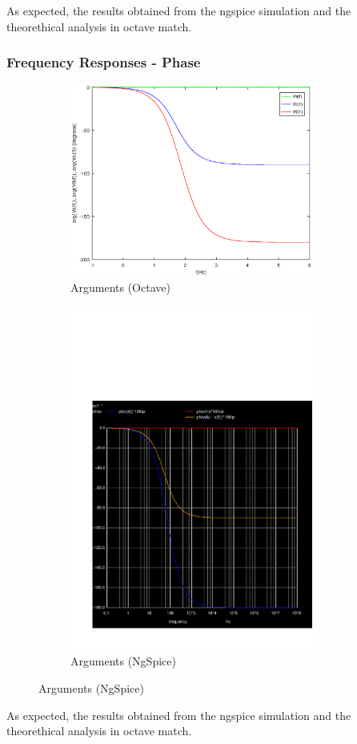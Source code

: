 As expected, the results obtained from the ngspice simulation and the theorethical analysis in octave match.

\subsubsection{Frequency Responses - Phase}

\begin{figure}[H] 
\centering
\begin{subfigure}{0.5\textwidth}
\includegraphics[width=8cm]{Arguments.eps}
\caption{Arguments (Octave)}
\label{fig:first}
\end{subfigure}
\begin{subfigure}{0.42\textwidth}
\includegraphics[width=8cm]{sim5_ph.pdf}
\caption{Arguments (NgSpice)}
\label{fig:second}
\end{subfigure}
\end{figure}

As expected, the results obtained from the ngspice simulation and the theorethical analysis in octave match.

